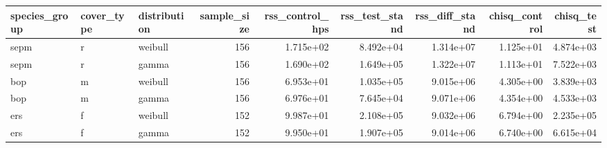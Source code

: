 \begin{tabular}{lllrrrrrr}
\toprule
species\_group & cover\_type & distribution & sample\_size & rss\_control\_hps & rss\_test\_stand & rss\_diff\_stand & chisq\_control & chisq\_test \\
\midrule
sepm & r & weibull & 156 & 1.715e+02 & 8.492e+04 & 1.314e+07 & 1.125e+01 & 4.874e+03 \\
sepm & r & gamma & 156 & 1.690e+02 & 1.649e+05 & 1.322e+07 & 1.113e+01 & 7.522e+03 \\
bop & m & weibull & 156 & 6.953e+01 & 1.035e+05 & 9.015e+06 & 4.305e+00 & 3.839e+03 \\
bop & m & gamma & 156 & 6.976e+01 & 7.645e+04 & 9.071e+06 & 4.354e+00 & 4.533e+03 \\
ers & f & weibull & 152 & 9.987e+01 & 2.108e+05 & 9.032e+06 & 6.794e+00 & 2.235e+05 \\
ers & f & gamma & 152 & 9.950e+01 & 1.907e+05 & 9.014e+06 & 6.740e+00 & 6.615e+04 \\
\bottomrule
\end{tabular}
